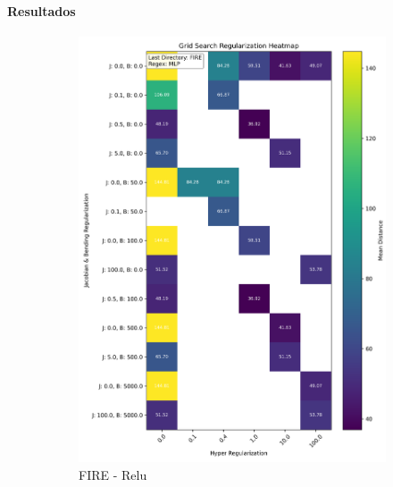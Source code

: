 \paragraph{Resultados}
\label{par:Resultados}

\begin{figure}[ht]
    \centering
    \begin{subfigure}[b]{0.45\textwidth}
        \centering
        \includegraphics[width=\textwidth]{imaxes/grid_search_single_heatmap_FIRE_MLP.png}
        \caption{FIRE - Relu}
        \label{fig:gs_single_FIRE_MLP}
    \end{subfigure}\hfill
    \begin{subfigure}[b]{0.45\textwidth}
        \centering

\end{subfigure}
\end{figure}

